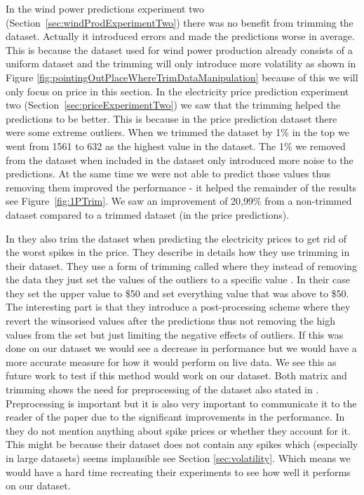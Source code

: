 In the wind power predictions experiment two (Section~\ref{sec:windProdExperimentTwo}) there was no benefit from trimming the dataset. Actually it introduced errors and made the predictions worse in average. This is because the dataset used for wind power production already consists of a uniform dataset and the trimming will only introduce more volatility as shown in Figure \ref{fig:pointingOutPlaceWhereTrimDataManipulation} because of this we will only focus on price in this section. In the electricity price prediction experiment two (Section~\ref{sec:priceExperimentTwo}) we saw that the trimming helped the predictions to be better. This is because in the price prediction dataset there were some extreme outliers. When we trimmed the dataset by 1\% in the top we went from 1561 to 632 as the highest value in the dataset. The 1\% we removed from the dataset when included in the dataset only introduced more noise to the predictions. At the same time we were not able to predict those values thus removing them improved the performance - it helped the remainder of the results see Figure~\ref{fig:1PTrim}. We saw an improvement of 20,99\% from a non-trimmed dataset compared to a trimmed dataset (in the price predictions).

In \cite{singhal2011electricity, yamin2004adaptive} they also trim the dataset when predicting the electricity prices to get rid of the worst spikes in the price. They describe in details how they use trimming in their dataset. They use a form of trimming called  where they instead of removing the data they just set the values of the outliers to a specific value \cite{yamin2004adaptive}. In their case they set the upper value to \$50 and set everything value that was above to \$50. The interesting part is that they introduce a post-processing scheme where they revert the winsorised values after the predictions thus not removing the high values from the set but just limiting the negative effects of outliers. If this was done on our dataset we would see a decrease in performance\cite{yamin2004adaptive} but we would have a more accurate measure for how it would perform on live data. We see this as future work to test if this method would work on our dataset. Both matrix and trimming shows the need for preprocessing of the dataset also stated in \cite{yamin2004adaptive}. Preprocessing is important but it is also very important to communicate it to the reader of the paper due to the significant improvements in the performance. In \cite{sansom1999neural, 1} they do not mention anything about spike prices or whether they account for it. This might be because their dataset does not contain any spikes which (especially in large datasets) seems implausible see Section \ref{sec:volatility}. Which means we would have a hard time recreating their experiments to see how well it performs on our dataset.

